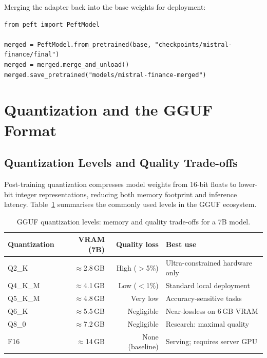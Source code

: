 Merging the adapter back into the base weights for deployment:

\begin{verbatim}
from peft import PeftModel

merged = PeftModel.from_pretrained(base, "checkpoints/mistral-finance/final")
merged = merged.merge_and_unload()
merged.save_pretrained("models/mistral-finance-merged")
\end{verbatim}

\section{Quantization and the GGUF Format}
\label{app:hf:quant}

\subsection{Quantization Levels and Quality Trade-offs}
\label{app:hf:quant-levels}

Post-training quantization compresses model weights from 16-bit floats to
lower-bit integer representations, reducing both memory footprint and
inference latency.  Table~\ref{tab:quant-levels} summarises the commonly
used levels in the GGUF ecosystem.

\begin{table}[ht]
\centering
\caption{GGUF quantization levels: memory and quality trade-offs for a 7B model.}
\label{tab:quant-levels}
\begin{tabular}{lrrl}
\toprule
\textbf{Quantization} & \textbf{VRAM (7B)} & \textbf{Quality loss} & \textbf{Best use} \\
\midrule
Q2\_K     & $\approx$2.8\,GB & High ($>$5\%)  & Ultra-constrained hardware only \\
Q4\_K\_M  & $\approx$4.1\,GB & Low ($<$1\%)   & Standard local deployment \\
Q5\_K\_M  & $\approx$4.8\,GB & Very low       & Accuracy-sensitive tasks \\
Q6\_K     & $\approx$5.5\,GB & Negligible     & Near-lossless on 6\,GB VRAM \\
Q8\_0     & $\approx$7.2\,GB & Negligible     & Research: maximal quality \\
F16       & $\approx$14\,GB  & None (baseline)& Serving; requires server GPU \\
\bottomrule
\end{tabular}
\end{table}

